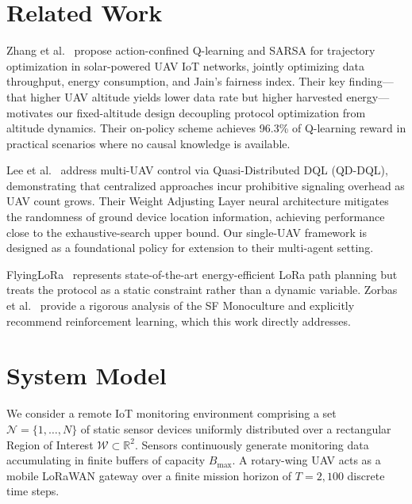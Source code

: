 \documentclass[conference]{IEEEtran}
\begin{document}
\section{Related Work}

Zhang et al.~\cite{b7} propose action-confined Q-learning and SARSA for trajectory optimization in solar-powered UAV IoT networks, jointly optimizing data throughput, energy consumption, and Jain's fairness index. Their key finding---that higher UAV altitude yields lower data rate but higher harvested energy---motivates our fixed-altitude design decoupling protocol optimization from altitude dynamics. Their on-policy scheme achieves 96.3\% of Q-learning reward in practical scenarios where no causal knowledge is available.

Lee et al.~\cite{b6} address multi-UAV control via Quasi-Distributed DQL (QD-DQL), demonstrating that centralized approaches incur prohibitive signaling overhead as UAV count grows. Their Weight Adjusting Layer neural architecture mitigates the randomness of ground device location information, achieving performance close to the exhaustive-search upper bound. Our single-UAV framework is designed as a foundational policy for extension to their multi-agent setting.

FlyingLoRa~\cite{b4} represents state-of-the-art energy-efficient LoRa path planning but treats the protocol as a static constraint rather than a dynamic variable. Zorbas et al.~\cite{b3} provide a rigorous analysis of the SF Monoculture and explicitly recommend reinforcement learning, which this work directly addresses.

\section{System Model}

We consider a remote IoT monitoring environment comprising a set $\mathcal{N} = \{1,\ldots,N\}$ of static sensor devices uniformly distributed over a rectangular Region of Interest $\mathcal{W} \subset \mathbb{R}^2$. Sensors continuously generate monitoring data accumulating in finite buffers of capacity $B_{\max}$. A rotary-wing UAV acts as a mobile LoRaWAN gateway over a finite mission horizon of $T = 2{,}100$ discrete time steps.
\end{document}
